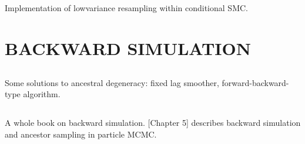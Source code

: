 \documentclass{article}
\begin{document}
\subsection*{\cite{lee2019}}
Implementation of lowvariance resampling within conditional SMC.

\subsection*{\cite{murray2016}}


\subsection*{\cite{whitley1994}}


\subsection*{\cite{carpenter1999}}


\subsection*{\cite{gerber2017}}


\subsection*{\cite{li2020}}


\subsection*{\cite{delmoral2012}}


%
\section*{BACKWARD SIMULATION}

\subsection*{\cite{kitagawa1996}}
Some solutions to ancestral degeneracy: fixed lag smoother, forward-backward-type algorithm.

\subsection*{\cite{doucet2009}}


\subsection*{\cite{lindsten2013}}
A whole book on backward simulation. [Chapter 5] describes backward simulation and ancestor sampling in particle MCMC.
\end{document}
